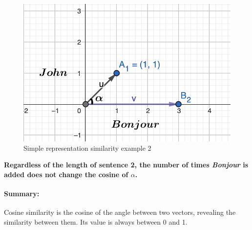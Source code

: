 \documentclass[a4paper, 14pt]{article}
\begin{document}
	\begin{figure}[H]
		\includegraphics[scale=0.5, width=15cm]{./img/vecteur_exemple_simple_example2.png}
		\caption{Simple representation similarity example 2}
	\end{figure}
	\textbf{Regardless of the length of sentence 2, the number of times \textit{Bonjour} is added does not change the cosine of $\alpha$.}
    \paragraph{Summary:} Cosine similarity is the cosine of the angle between two vectors, revealing the similarity between them. Its value is always between 0 and 1.
\end{document}
